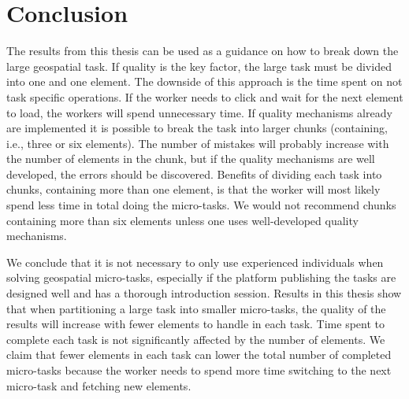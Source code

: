 \chapter{Conclusion}
The results from this thesis can be used as a guidance on how to break down the large geospatial task. If quality is the key factor, the large task must be divided into one and one element. The downside of this approach is the time spent on not task specific operations. If the worker needs to click and wait for the next element to load, the workers will spend unnecessary time. If quality mechanisms already are implemented it is possible to break the task into larger chunks (containing, i.e., three or six elements). The number of mistakes will probably increase with the number of elements in the chunk, but if the quality mechanisms are well developed, the errors should be discovered. Benefits of dividing each task into chunks, containing more than one element, is that the worker will most likely spend less time in total doing the micro-tasks. We would not recommend chunks containing more than six elements unless one uses well-developed quality mechanisms. 

We conclude that it is not necessary to only use experienced individuals when solving geospatial micro-tasks, especially if the platform publishing the tasks are designed well and has a thorough introduction session. 
Results in this thesis show that when partitioning a large task into smaller micro-tasks, the quality of the results will increase with fewer elements to handle in each task. Time spent to complete each task is not significantly affected by the number of elements.
We claim that fewer elements in each task can lower the total number of completed micro-tasks because the worker needs to spend more time switching to the next micro-task and fetching new elements. 